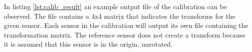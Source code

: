 In listing \ref{lst:calib_result} an example output file of the calibration can be observed. The file contains a 4x4 matrix that indicates the transforms for the given sensor. Each sensor in the calibration will output its own file containing the transformation matrix. The reference sensor does not create a transform because it is assumed that this sensor is in the origin, unrotated. 



















 


